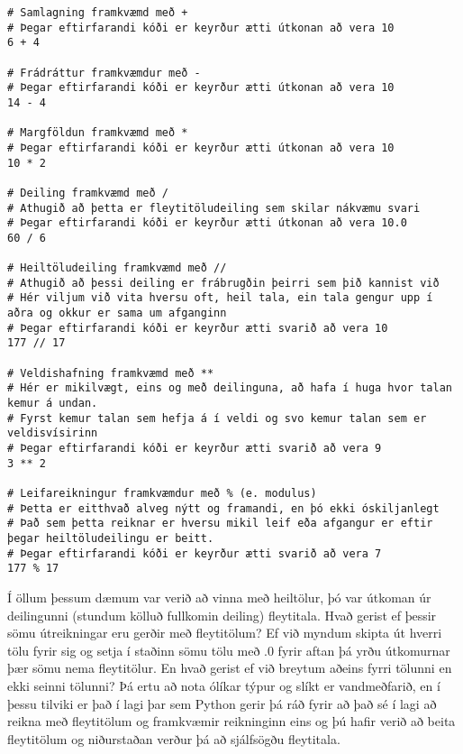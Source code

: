 \documentclass[11pt,fleqn]{book} %
\begin{document}
\begin{lstlisting}[caption=Reikniaðgerðir]
# Samlagning framkvæmd með + 
# Þegar eftirfarandi kóði er keyrður ætti útkonan að vera 10
6 + 4 

# Frádráttur framkvæmdur með -
# Þegar eftirfarandi kóði er keyrður ætti útkonan að vera 10
14 - 4 

# Margföldun framkvæmd með * 
# Þegar eftirfarandi kóði er keyrður ætti útkonan að vera 10
10 * 2 

# Deiling framkvæmd með / 
# Athugið að þetta er fleytitöludeiling sem skilar nákvæmu svari
# Þegar eftirfarandi kóði er keyrður ætti útkonan að vera 10.0
60 / 6 

# Heiltöludeiling framkvæmd með //
# Athugið að þessi deiling er frábrugðin þeirri sem þið kannist við
# Hér viljum við vita hversu oft, heil tala, ein tala gengur upp í aðra og okkur er sama um afganginn
# Þegar eftirfarandi kóði er keyrður ætti svarið að vera 10
177 // 17

# Veldishafning framkvæmd með **
# Hér er mikilvægt, eins og með deilinguna, að hafa í huga hvor talan kemur á undan.
# Fyrst kemur talan sem hefja á í veldi og svo kemur talan sem er veldisvísirinn
# Þegar eftirfarandi kóði er keyrður ætti svarið að vera 9
3 ** 2

# Leifareikningur framkvæmdur með % (e. modulus)
# Þetta er eitthvað alveg nýtt og framandi, en þó ekki óskiljanlegt
# Það sem þetta reiknar er hversu mikil leif eða afgangur er eftir þegar heiltöludeilingu er beitt.
# Þegar eftirfarandi kóði er keyrður ætti svarið að vera 7
177 % 17

\end{lstlisting}

Í öllum þessum dæmum var verið að vinna með heiltölur, þó var útkoman úr deilingunni (stundum kölluð fullkomin deiling) fleytitala. 
Hvað gerist ef þessir sömu útreikningar eru gerðir með fleytitölum? 
Ef við myndum skipta út hverri tölu fyrir sig og setja í staðinn sömu tölu með .0 fyrir aftan þá yrðu útkomurnar þær sömu nema fleytitölur. 
En hvað gerist ef við breytum aðeins fyrri tölunni en ekki seinni tölunni?
Þá ertu að nota ólíkar týpur og slíkt er vandmeðfarið, en í þessu tilviki er það í lagi þar sem Python gerir þá ráð fyrir að það sé í lagi að reikna með fleytitölum og framkvæmir reikninginn eins og þú hafir verið að beita fleytitölum og niðurstaðan verður þá að sjálfsögðu fleytitala.
\end{document}
